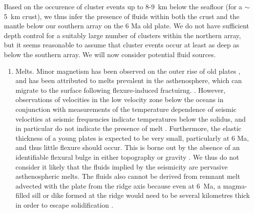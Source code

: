 \documentclass[reviewcopy]{elsart}
\begin{document}
Based on the occurence of cluster events up to 8-9~km below the
seafloor (for a $\sim$5~km crust), we thus infer
the presence of fluids within both the crust and the  mantle below our southern
array on the 6 Ma old plate. 
We do not have sufficient
depth control for a suitably large number of clusters within the
northern array, but it seems reasonable to assume that cluster events
occur at least as deep as below the southern array. We will now
consider potential fluid sources. 
\begin{enumerate}
\item Melts. Minor magnetism has been observed on the outer rise of
  old plates \citep{hirano04}, and has been attributed to
  melts prevalent in the asthenosphere, which can migrate to the
  surface following flexure-induced fractuirng. 
  \citep{hirano06}.   However, observations of velocities in
  the low velocity zone below the oceans  in conjunction with
  measurements of the temperature dependence of seismic velocities at
  seismic frequencies indicate temperatures below the solidus, and in
  particular do not indicate the presence of melt \citep{priestley05,faul05}. 
   Furthermore, the elastic thickness of a young plates
   is expected to be very small, particularly at 6 Ma, and thus little flexure should
  occur.   This   is borne out by the absence of an identifiable flexural bulge in either topography or
  gravity \citep[e.g.]{bry03}.   We thus do not consider it likely that
  the fluids implied by the seismicity are pervasive asthenospheric
  melts.  The fluids also cannot be derived from remnant melt advected
  with the plate from the ridge axis because
  even at 6~Ma, a magma-filled sill or dike formed
  at the ridge would need to be several kilometres thick in order to
  escape solidification \citep{turcotte02}.
%


\end{enumerate}
\end{document}
